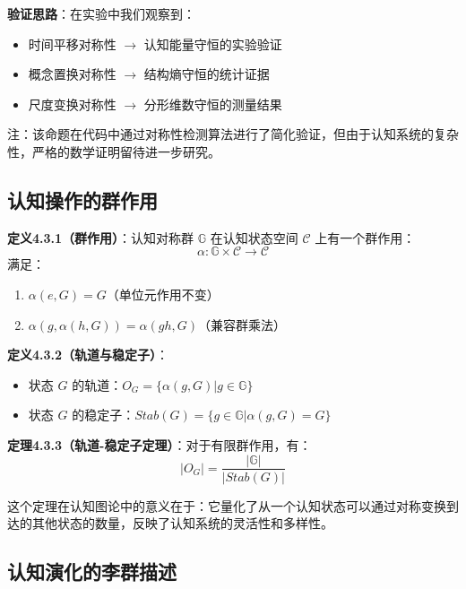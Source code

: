 \documentclass[12pt,a4paper]{article}
\newcommand{\cognitivespace}{\mathcal{C}}
\newcommand{\cognitivegroup}{\mathbb{G}}
\begin{document}
\textbf{验证思路}：在实验中我们观察到：
\begin{itemize}
\item 时间平移对称性 $\rightarrow$ 认知能量守恒的实验验证
\item 概念置换对称性 $\rightarrow$ 结构熵守恒的统计证据
\item 尺度变换对称性 $\rightarrow$ 分形维数守恒的测量结果
\end{itemize}

注：该命题在代码中通过对称性检测算法进行了简化验证，但由于认知系统的复杂性，严格的数学证明留待进一步研究。

\subsection{认知操作的群作用}

\textbf{定义4.3.1（群作用）}：认知对称群 $\cognitivegroup$ 在认知状态空间 $\cognitivespace$ 上有一个群作用：
\begin{equation}
\alpha: \cognitivegroup \times \cognitivespace \rightarrow \cognitivespace
\end{equation}
满足：
\begin{enumerate}
\item $\alpha(e, G) = G$（单位元作用不变）
\item $\alpha(g, \alpha(h, G)) = \alpha(gh, G)$（兼容群乘法）
\end{enumerate}

\textbf{定义4.3.2（轨道与稳定子）}：
\begin{itemize}
\item 状态 $G$ 的轨道：$O_G = \{\alpha(g, G) | g \in \cognitivegroup\}$
\item 状态 $G$ 的稳定子：$Stab(G) = \{g \in \cognitivegroup | \alpha(g, G) = G\}$
\end{itemize}

\textbf{定理4.3.3（轨道-稳定子定理）}：对于有限群作用，有：
\begin{equation}
|O_G| = \frac{|\cognitivegroup|}{|Stab(G)|}
\end{equation}

这个定理在认知图论中的意义在于：它量化了从一个认知状态可以通过对称变换到达的其他状态的数量，反映了认知系统的灵活性和多样性。

\subsection{认知演化的李群描述}
\end{document}
